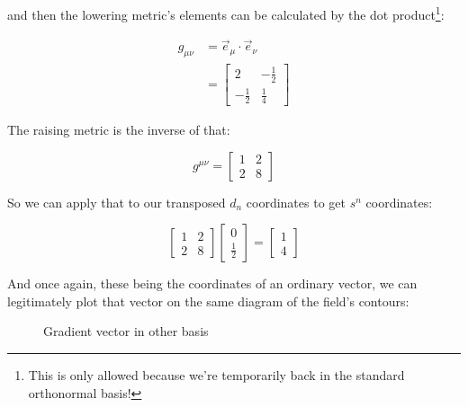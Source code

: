 and then the lowering metric's elements can be calculated by the dot product\footnote{This is only allowed because we're temporarily back in the standard orthonormal basis!}:

\begin{equation}
\begin{split}
    g_{\mu\nu} &= \vec{e}_{\mu} \cdot \vec{e}_{\nu} \\
    &= \begin{bmatrix}
        2 & -\frac{1}{2} \\
        -\frac{1}{2} & \frac{1}{4}
        \end{bmatrix}
\end{split}
\end{equation}

The raising metric is the inverse of that:

\begin{equation}
    g^{\mu\nu} = 
    \begin{bmatrix}
    1 & 2 \\
    2 & 8
    \end{bmatrix}
\end{equation}

So we can apply that to our transposed $d_n$ coordinates to get $s^n$ coordinates:

$$
\begin{bmatrix}
    1 & 2 \\
    2 & 8
\end{bmatrix}
\begin{bmatrix}
    0 \\
    \frac{1}{2}
\end{bmatrix}
= 
\begin{bmatrix}
    1 \\
    4
\end{bmatrix}
$$

And once again, these being the coordinates of an ordinary vector, we can legitimately plot that vector on the same diagram of the field's contours:

\begin{figure}[h]
    \caption{Gradient vector in other basis}
    \centering
    \label{fig:gradient-vector-awk}
\end{figure}

